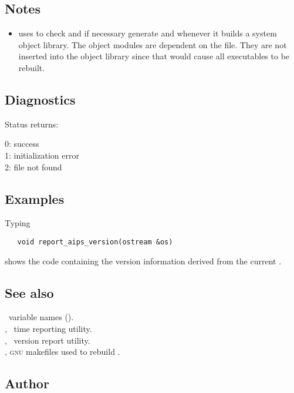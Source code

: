 \subsection*{Notes}
 
\begin{itemize}
\item
    uses  to check and if necessary generate
    and  whenever it
   builds a system object library.  The  object modules are
   dependent on the  file.  They are not inserted
   into the object library since that would cause all executables to be
   rebuilt.
\end{itemize}
 
\subsection*{Diagnostics}
 
Status returns:
\begin{status}
   0: success\\
   1: initialization error\\
   2:  file not found
\end{status}
 
\subsection*{Examples}
 
Typing

\begin{verbatim}
   void report_aips_version(ostream &os)
\end{verbatim}

\noindent
shows the code containing the version information derived from the current
.
 
\subsection*{See also}
 
\aipspp\ variable names ().\\
, \aipspp\ time reporting utility.\\
, \aipspp\ version report utility.\\
, \textsc{gnu} makefiles used to rebuild \aipspp.
 
\subsection*{Author}
 
